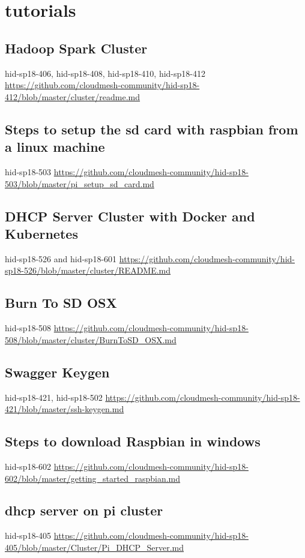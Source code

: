 \chapter{tutorials}

\section{Hadoop Spark Cluster }
hid-sp18-406,  hid-sp18-408, hid-sp18-410, hid-sp18-412
\url{https://github.com/cloudmesh-community/hid-sp18-412/blob/master/cluster/readme.md}

 
\section{Steps to setup the sd card with raspbian from a linux machine}
hid-sp18-503 
\url{https://github.com/cloudmesh-community/hid-sp18-503/blob/master/pi_setup_sd_card.md}


\section{DHCP Server Cluster with Docker and Kubernetes }
hid-sp18-526 and hid-sp18-601
\url{https://github.com/cloudmesh-community/hid-sp18-526/blob/master/cluster/README.md}

\section{Burn To SD OSX}
hid-sp18-508
\url{https://github.com/cloudmesh-community/hid-sp18-508/blob/master/cluster/BurnToSD_OSX.md}

\section{Swagger Keygen}
hid-sp18-421, hid-sp18-502
\url{https://github.com/cloudmesh-community/hid-sp18-421/blob/master/ssh-keygen.md}

\section{Steps to download Raspbian in windows}
hid-sp18-602
\url{https://github.com/cloudmesh-community/hid-sp18-602/blob/master/getting_started_raspbian.md}

\section{dhcp server on pi cluster}
hid-sp18-405 
\url{https://github.com/cloudmesh-community/hid-sp18-405/blob/master/Cluster/Pi_DHCP_Server.md}

